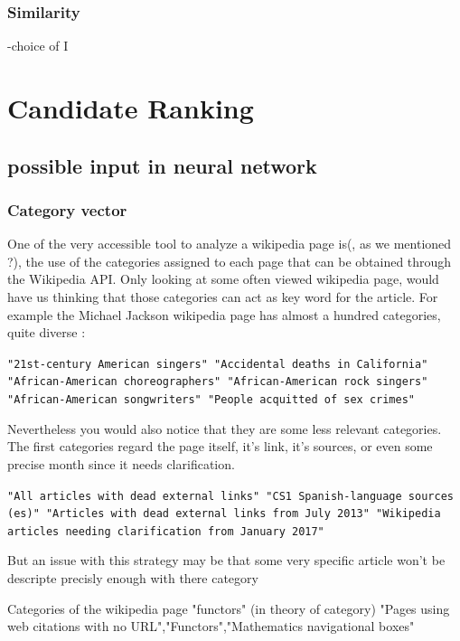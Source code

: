 \documentclass[11pt]{article}
\theoremstyle{plain}
\theoremstyle{definition}
\theoremstyle{remark}
\begin{document}
\subsubsection{Similarity}

-choice of I


\section{Candidate Ranking}

\subsection{possible input in neural network}

\subsubsection{Category vector}

One of the very accessible tool to analyze a wikipedia page is(, as we mentioned ?), the use of the categories assigned to each page that can be obtained through the Wikipedia API.
Only looking at some often viewed wikipedia page, would have us thinking that those categories can act as key word for the article. For example the Michael Jackson wikipedia page has almost a hundred categories, quite diverse :
 \begin{center}
	\texttt{"21st-century American singers" "Accidental deaths in California" "African-American choreographers" "African-American rock singers" "African-American songwriters"  "People acquitted of sex crimes"}
 \end{center}

Nevertheless you would also notice that they are some less relevant categories. The first categories regard the page itself, it's link, it's sources, or even some precise month since it needs clarification.

 \begin{center}
	\texttt{"All articles with dead external links" "CS1 Spanish-language sources (es)" "Articles with dead external links from July 2013" "Wikipedia articles needing clarification from January 2017"}
 \end{center}
But an issue with this strategy may be that some very specific article won't be descripte precisly enough with there category 


Categories of the wikipedia page "functors" (in theory of category)
"Pages using web citations with no URL","Functors","Mathematics navigational boxes"
\end{document}
